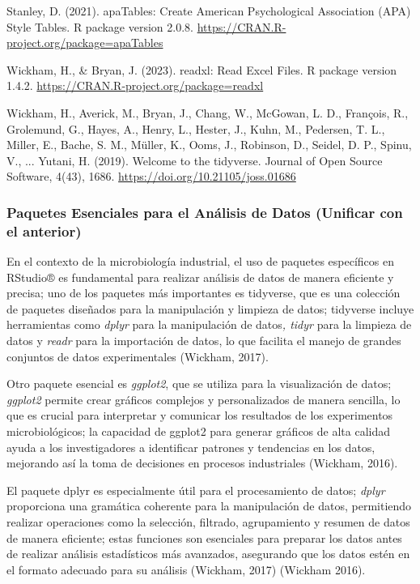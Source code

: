 \documentclass[
  letterpaper,
  DIV=11,
  numbers=noendperiod]{scrreprt}
\begin{document}
Stanley, D. (2021). apaTables: Create American Psychological Association
(APA) Style Tables. R package version 2.0.8.
\url{https://CRAN.R-project.org/package=apaTables}

Wickham, H., \& Bryan, J. (2023). readxl: Read Excel Files. R package
version 1.4.2. \url{https://CRAN.R-project.org/package=readxl}

Wickham, H., Averick, M., Bryan, J., Chang, W., McGowan, L. D.,
François, R., Grolemund, G., Hayes, A., Henry, L., Hester, J., Kuhn, M.,
Pedersen, T. L., Miller, E., Bache, S. M., Müller, K., Ooms, J.,
Robinson, D., Seidel, D. P., Spinu, V., ... Yutani, H. (2019). Welcome
to the tidyverse. Journal of Open Source Software, 4(43), 1686.
\url{https://doi.org/10.21105/joss.01686}

\subsubsection{Paquetes Esenciales para el Análisis de Datos (Unificar
con el
anterior)}\label{paquetes-esenciales-para-el-anuxe1lisis-de-datos-unificar-con-el-anterior}

En el contexto de la microbiología industrial, el uso de paquetes
específicos en RStudio® es fundamental para realizar análisis de datos
de manera eficiente y precisa; uno de los paquetes más importantes es
tidyverse, que es una colección de paquetes diseñados para la
manipulación y limpieza de datos; tidyverse incluye herramientas como
\emph{dplyr} para la manipulación de datos\emph{, tidyr} para la
limpieza de datos y \emph{readr} para la importación de datos, lo que
facilita el manejo de grandes conjuntos de datos experimentales
(Wickham, 2017).

Otro paquete esencial es \emph{ggplot2}, que se utiliza para la
visualización de datos; \emph{ggplot2} permite crear gráficos complejos
y personalizados de manera sencilla, lo que es crucial para interpretar
y comunicar los resultados de los experimentos microbiológicos; la
capacidad de ggplot2 para generar gráficos de alta calidad ayuda a los
investigadores a identificar patrones y tendencias en los datos,
mejorando así la toma de decisiones en procesos industriales (Wickham,
2016).

El paquete dplyr es especialmente útil para el procesamiento de datos;
\emph{dplyr} proporciona una gramática coherente para la manipulación de
datos, permitiendo realizar operaciones como la selección, filtrado,
agrupamiento y resumen de datos de manera eficiente; estas funciones son
esenciales para preparar los datos antes de realizar análisis
estadísticos más avanzados, asegurando que los datos estén en el formato
adecuado para su análisis (Wickham, 2017) (Wickham 2016).
\end{document}
